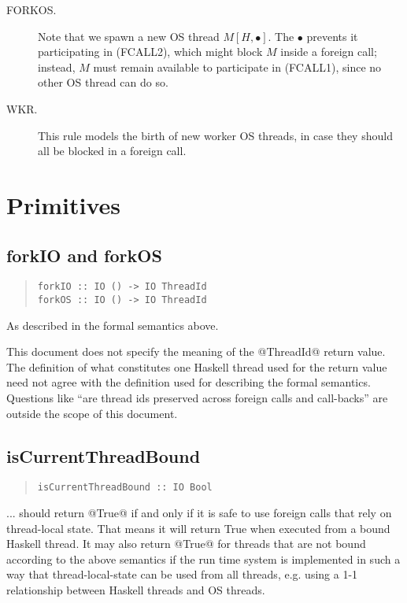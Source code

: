 \documentclass{article}
\begin{document}
\begin{description}
\item[FORKOS.]  Note that we spawn a new OS thread $M[H,\bullet]$.  The $\bullet$ prevents it
participating in (FCALL2), which might block $M$ inside a foreign call; instead, $M$ must
remain available to participate in (FCALL1), since no other OS thread can do so.

\item[WKR.] This rule models the birth of new worker OS threads, in case they should
all be blocked in a foreign call.
\end{description}

\section{Primitives}

\subsection{forkIO and forkOS}

\begin{quote}
\begin{verbatim}
forkIO :: IO () -> IO ThreadId
forkOS :: IO () -> IO ThreadId
\end{verbatim}
\end{quote}

As described in the formal semantics above.

This document does not specify the meaning of the @ThreadId@ return value. The
definition of what constitutes one Haskell thread used for the return value
need not agree with the definition used for describing the formal semantics.
Questions like ``are thread ids preserved across foreign calls and call-backs''
are outside the scope of this document.

\subsection{isCurrentThreadBound}

\begin{quote}
\begin{verbatim}
isCurrentThreadBound :: IO Bool
\end{verbatim}
\end{quote}

... should return @True@ if and only if it is safe to use foreign calls that
rely on thread-local state. That means it will return True when executed from a
bound Haskell thread. It may also return @True@ for threads that are not bound
according to the above semantics if the run time system is implemented in such
a way that thread-local-state can be used from all threads, e.g. using a 1-1
relationship between Haskell threads and OS threads.
\end{document}
